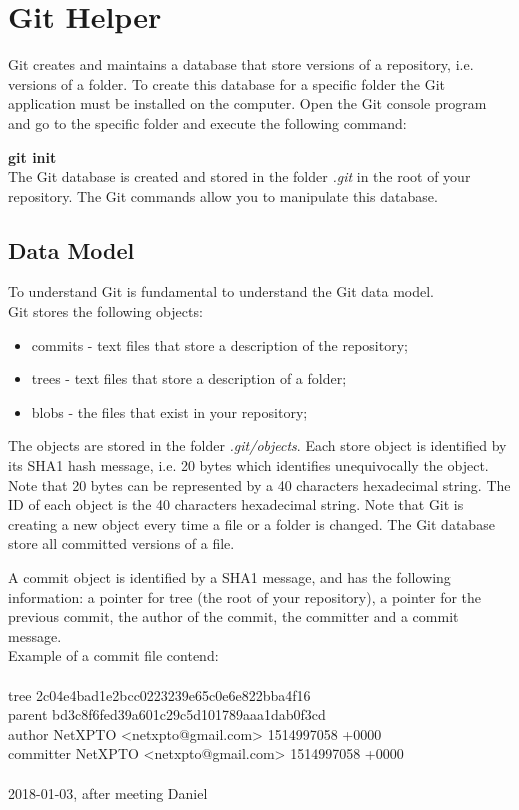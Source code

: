 \chapter{Git Helper}

Git creates and maintains a database that store versions of a repository, i.e. versions of a folder.
To create this database for a specific folder the Git application must be installed on the computer. Open the Git console program and go to the specific folder and execute the following command:
\\[0mm]
\par\textbf{git init}
\\[5mm]
The Git database is created and stored in the folder \emph{.git} in the root of your repository. The Git commands allow you to manipulate this database.

\section{Data Model}

To understand Git is fundamental to understand the Git data model.
\\[5mm]
Git stores the following objects:

\begin{itemize}
    \item[\textbullet] {commits - text files that store a description of the repository;}
    \item[\textbullet] {trees - text files that store a description of a folder;}
    \item[\textbullet] {blobs - the files that exist in your repository;}
\end{itemize}

\noindent The objects are stored in the folder \emph{.git/objects}. Each store object is identified by its SHA1 hash message, i.e. 20 bytes which identifies unequivocally the object. Note that 20 bytes can be represented by a 40 characters hexadecimal string. The ID of each object is the 40 characters hexadecimal string. Note that Git is creating a new object every time a file or a folder is changed. The Git database store all committed versions of a file.

A commit object is identified by a SHA1 message, and has the following information: a pointer for tree (the root of your repository), a pointer for the previous commit, the author of the commit, the committer and a commit message.\\
%
Example of a commit file contend:\\
\\
tree 2c04e4bad1e2bcc0223239e65c0e6e822bba4f16\\
parent bd3c8f6fed39a601c29c5d101789aaa1dab0f3cd\\
author NetXPTO <netxpto@gmail.com> 1514997058 +0000\\
committer NetXPTO <netxpto@gmail.com> 1514997058 +0000\\
\\
2018-01-03, after meeting Daniel\\

